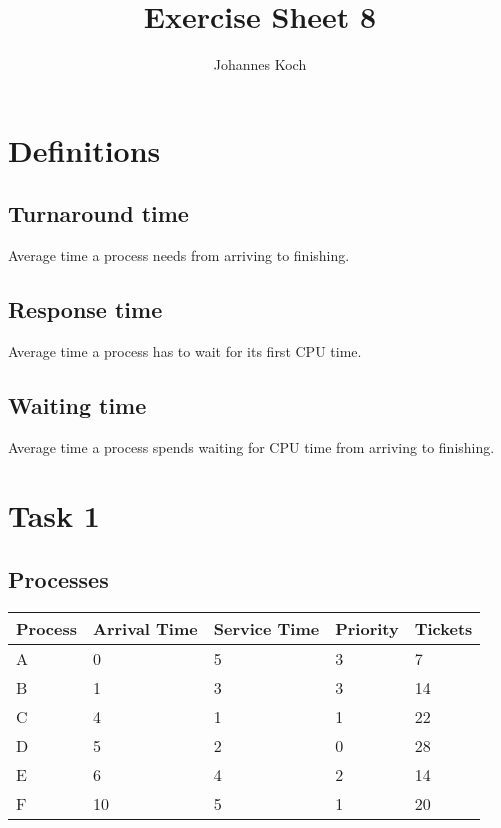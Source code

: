 \documentclass[11pt]{article} %
\title{Exercise Sheet 8}
\author{Johannes Koch}
\begin{document}
\maketitle

\section{Definitions}

\subsection{Turnaround time}
Average time a process needs from arriving to finishing.

\subsection{Response time}
Average time a process has to wait for its first CPU time.

\subsection{Waiting time}
Average time a process spends waiting for CPU time from arriving to finishing.

\section{Task 1}
\subsection{Processes}

\begin{center}
  {
  \begin{tabular}{|p{2cm}|p{2cm}|p{2cm}|p{2cm}|p{2cm}|}
    \hline
    \textbf{Process} & \textbf{Arrival Time} & \textbf{Service Time} & \textbf{Priority} & \textbf{Tickets}\\
    \hline
    A & 0 & 5 & 3 & 7\\
    B & 1 & 3 & 3 & 14\\
    C & 4 & 1 & 1 & 22\\
    D & 5 & 2 & 0 & 28\\
    E & 6 & 4 & 2 & 14\\
    F & 10 & 5 & 1 & 20\\
    \hline
  \end{tabular}
  }
\end{center}
\end{document}
